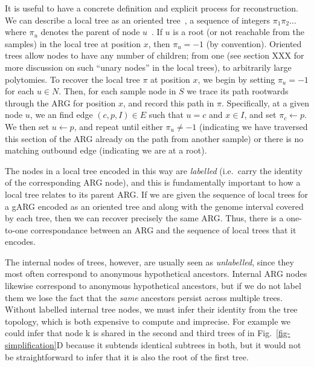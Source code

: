 \documentclass{article}
\begin{document}
It is useful to have
a concrete definition and explicit process for reconstruction.
We can describe a local tree as an
oriented tree~\cite[p.\ 461]{knuth11combinatorial},
a sequence of integers $\pi_1\pi_2\dots$ where $\pi_u$ denotes the parent of
node $u$~\citep{kelleher2013coalescent,kelleher2014coalescent,kelleher2016efficient}.
If $u$ is a root
(or not reachable from the samples)
in the local tree at position $x$, then $\pi_u = -1$ (by convention).
Oriented trees allow nodes
to have  any number of children; from one (see section XXX for more
discussion on such ``unary nodes'' in the local trees), to arbitrarily
large polytomies.
To recover the local tree $\pi$ at position $x$, we begin by
setting $\pi_u = -1$ for each $u\in N$. Then, for each sample
node in $S$ we trace its path rootwards through the
ARG for position $x$, and record this path in $\pi$.
Specifically, at a given node $u$,
we an find edge $(c, p, I) \in E$ such that $u = c$ and $x \in I$, and set
$\pi_c \leftarrow p$. We then set $u \leftarrow p$, and repeat
until either $\pi_u \neq -1$ (indicating we have traversed this section
of the ARG already on the path from another sample) or there
is no matching outbound edge (indicating we are at a root).

The nodes in a local tree encoded
in this way are \emph{labelled} (i.e.\ carry the identity
of the corresponding ARG node), and this is fundamentally
important to how a local tree relates to its parent ARG.
If we are given the sequence of local trees for a gARG
encoded as an oriented tree
and along with the genome interval covered by each tree,
then we can recover precisely the same ARG. Thus, there
is a one-to-one correspondance between an ARG and
the sequence of local trees that it encodes.

The internal nodes of trees, however, are usually
seen as \emph{unlabelled}, since they most often correspond
to anonymous hypothetical ancestors. Internal
ARG nodes likewise correspond to anonymous hypothetical
ancestors, but if we do not label them we lose the fact that
the \emph{same} ancestors persist across multiple trees.
Without labelled internal tree nodes,
we must infer their identity
from the tree topology, which is both
expensive to compute and imprecise. For example
we could infer that node \textsf{k} is shared in the second
and third trees of in Fig.~\ref{fig-simplification}D
because it subtends identical subtrees in both,
but it would not be straightforward to infer that it
is also the root of the first tree.
\end{document}
